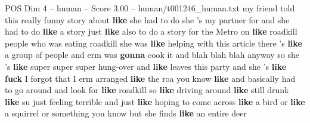 \begin{textsample}{POS Dim 4 – human – Score 3.00 – human/t001246\_human.txt}  \label{ex:f4_pos_018}
my friend told this really funny story about \textbf{like} she had to do she 's my partner for and she had to do \textbf{like} a story just \textbf{like} also to do a story for the Metro on \textbf{like} roadkill people who was eating roadkill she was \textbf{like} helping with this article there 's \textbf{like} a group of people and erm was \textbf{gonna} cook it and blah blah blah anyway so she 's \textbf{like} super super super hung-over and \textbf{like} leaves this party and she 's \textbf{like} \textbf{fuck} I forgot that I erm arranged \textbf{like} the roa you know \textbf{like} and basically had to go around and look for \textbf{like} roadkill so \textbf{like} driving around \textbf{like} still drunk \textbf{like} su just feeling terrible and just \textbf{like} hoping to come across \textbf{like} a bird or \textbf{like} a squirrel or something you know but she finds \textbf{like} an entire deer

\end{textsample}
